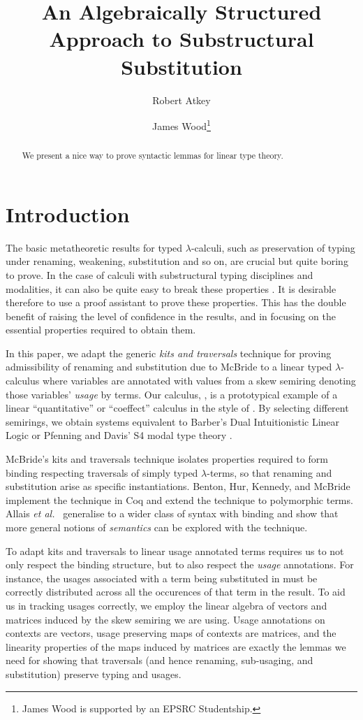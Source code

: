 \documentclass[submission,copyright,creativecommons]{eptcs}
\title{An Algebraically Structured Approach to Substructural Substitution}
\author{Robert Atkey
\institute{University of Strathclyde\\ Glasgow, United Kingdom}
\email{robert.atkey@strath.ac.uk}
\and
James Wood\thanks{James Wood is supported by an EPSRC Studentship.}
\institute{University of Strathclyde\\ Glasgow, United Kingdom}
\email{james.wood.100@strath.ac.uk}
}
\begin{document}
\maketitle

\begin{abstract}
  We present a nice way to prove syntactic lemmas for linear type theory.
\end{abstract}

\section{Introduction}

The basic metatheoretic results for typed $\lambda$-calculi, such as
preservation of typing under renaming, weakening, substitution and so
on, are crucial but quite boring to prove. In the case of calculi with
substructural typing disciplines and modalities, it can also be quite
easy to break these properties \cite{wadler91use}. It is desirable
therefore to use a proof assistant to prove these properties. This has
the double benefit of raising the level of confidence in the results,
and in focusing on the essential properties required to obtain them.

In this paper, we adapt the generic \emph{kits and traversals}
technique for proving admissibility of renaming and substitution due
to McBride \cite{rensub05} to a linear typed $\lambda$-calculus where
variables are annotated with values from a skew semiring denoting
those variables' \emph{usage} by terms. Our calculus, \name{}, is a
prototypical example of a linear ``quantitative'' or ``coeffect''
calculus in the style of
\cite{reed10distance,BrunelGMZ14,GhicaS14,PetricekOM14,Granule18}. By
selecting different semirings, we obtain systems equivalent to
Barber's Dual Intuitionistic Linear Logic \cite{Barber1996} or
Pfenning and Davis' S4 modal type theory \cite{judgmental}.

McBride's kits and traversals technique isolates properties required
to form binding respecting traversals of simply typed $\lambda$-terms,
so that renaming and substitution arise as specific
instantiations. Benton, Hur, Kennedy, and McBride \cite{bhkm12}
implement the technique in Coq and extend the technique to polymorphic
terms. Allais \emph{et al.}~\cite{AACMM20} generalise to a wider class
of syntax with binding and show that more general notions of
\emph{semantics} can be explored with the technique.

To adapt kits and traversals to linear usage annotated terms requires
us to not only respect the binding structure, but to also respect the
\emph{usage} annotations. For instance, the usages associated with a
term being substituted in must be correctly distributed across all the
occurences of that term in the result. To aid us in tracking usages
correctly, we employ the linear algebra of vectors and matrices
induced by the skew semiring we are using. Usage annotations on
contexts are vectors, usage preserving maps of contexts are matrices,
and the linearity properties of the maps induced by matrices are
exactly the lemmas we need for showing that traversals (and hence
renaming, sub-usaging, and substitution) preserve typing and usages.
\end{document}

